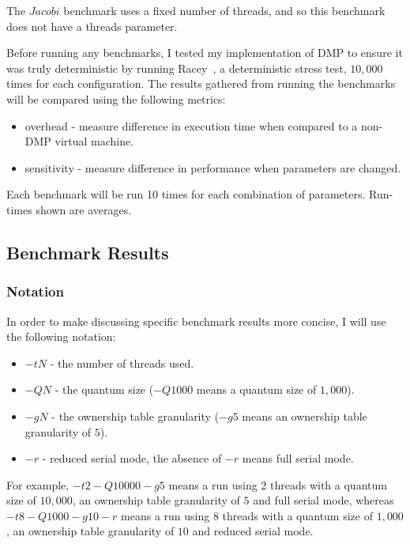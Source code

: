The $Jacobi$ benchmark uses a fixed number of threads, and so this
benchmark does not have a threads parameter.

Before running any benchmarks, I tested my implementation of DMP to
ensure it was truly deterministic by running Racey~\cite{racey}, a
deterministic stress test, $10,000$ times for each configuration.  The
results gathered from running the benchmarks will be compared using
the following metrics:

\begin{itemize}
\item overhead - measure difference in execution time when compared to
  a non-DMP virtual machine.

\item sensitivity - measure difference in performance when parameters
  are changed.
\end{itemize}

Each benchmark will be run 10 times for each combination of
parameters.  Run-times shown are averages.

\subsection{Benchmark Results}

\subsubsection{Notation}

In order to make discussing specific benchmark results more concise, I
will use the following notation:

\begin{itemize}
\item $-tN$ - the number of threads used.

\item $-QN$ - the quantum size ($-Q1000$ means a quantum size of
  $1,000$).

\item $-gN$ - the ownership table granularity ($-g5$ means an
  ownership table granularity of $5$).

\item $-r$ - reduced serial mode, the absence of $-r$ means full
  serial mode.
\end{itemize}

For example, $-t2 -Q10000 -g5$ means a run using 2 threads with a
quantum size of $10,000$, an ownership table granularity of $5$ and
full serial mode, whereas $-t8 -Q1000 -g10 -r$ means a run using 8
threads with a quantum size of $1,000$, an ownership table granularity
of $10$ and reduced serial mode.

